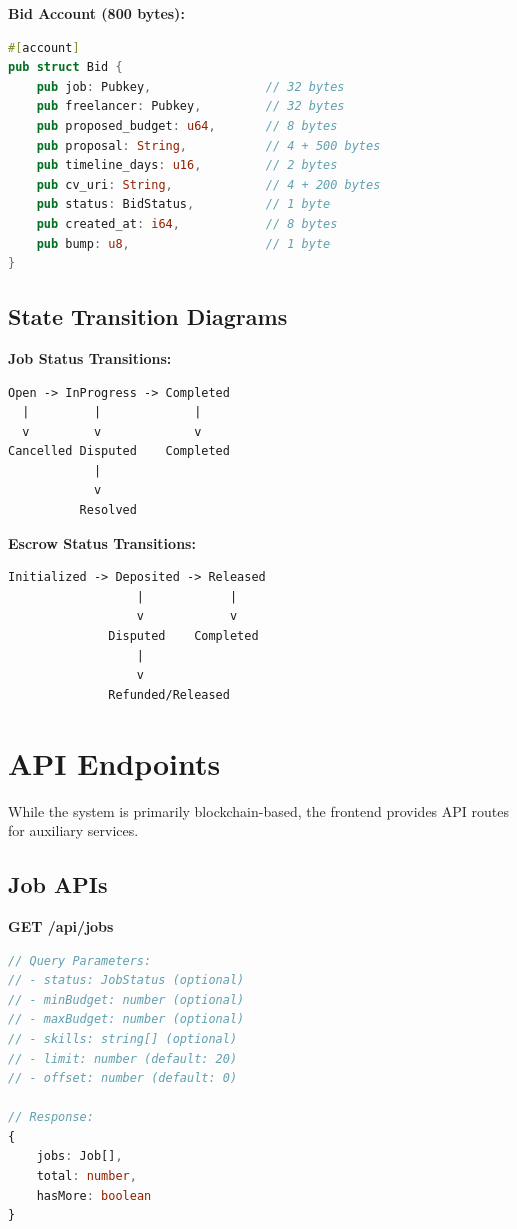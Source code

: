 \documentclass[a4paper,13pt,twoside]{report}
\theoremstyle{definition}
\begin{document}
\textbf{Bid Account (800 bytes):}
\begin{lstlisting}[language=Rust]
#[account]
pub struct Bid {
    pub job: Pubkey,                // 32 bytes
    pub freelancer: Pubkey,         // 32 bytes
    pub proposed_budget: u64,       // 8 bytes
    pub proposal: String,           // 4 + 500 bytes
    pub timeline_days: u16,         // 2 bytes
    pub cv_uri: String,             // 4 + 200 bytes
    pub status: BidStatus,          // 1 byte
    pub created_at: i64,            // 8 bytes
    pub bump: u8,                   // 1 byte
}
\end{lstlisting}

\subsection{State Transition Diagrams}

\textbf{Job Status Transitions:}
\begin{verbatim}
Open -> InProgress -> Completed
  |         |             |
  v         v             v
Cancelled Disputed    Completed
            |
            v
          Resolved
\end{verbatim}

\textbf{Escrow Status Transitions:}
\begin{verbatim}
Initialized -> Deposited -> Released
                  |            |
                  v            v
              Disputed    Completed
                  |
                  v
              Refunded/Released
\end{verbatim}

\section{API Endpoints}

While the system is primarily blockchain-based, the frontend provides API routes for auxiliary services.

\subsection{Job APIs}

\textbf{GET /api/jobs}
\begin{lstlisting}[language=TypeScript]
// Query Parameters:
// - status: JobStatus (optional)
// - minBudget: number (optional)
// - maxBudget: number (optional)
// - skills: string[] (optional)
// - limit: number (default: 20)
// - offset: number (default: 0)

// Response:
{
    jobs: Job[],
    total: number,
    hasMore: boolean
}
\end{lstlisting}
\end{document}
